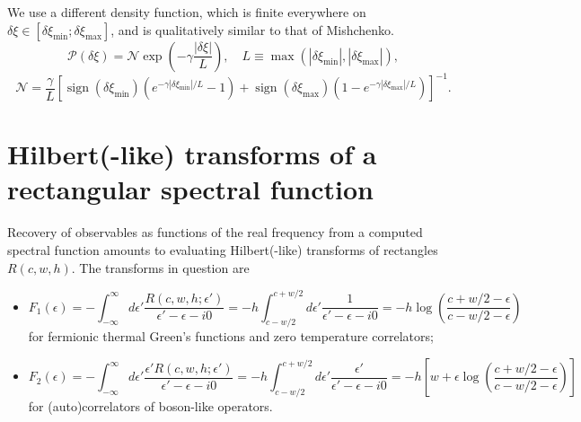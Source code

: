 \documentclass[]{article}
\DeclareMathOperator{\sign}{sign}
\begin{document}
We use a different density function, which is finite everywhere on $\delta\xi\in[\delta\xi_\mathrm{min};\delta\xi_\mathrm{max}]$, and is qualitatively similar to that of Mishchenko.
\begin{equation}
	\mathcal{P}(\delta\xi) = \mathcal{N}
	\exp\left(-\gamma \frac{|\delta\xi|}{L}\right), \quad
	L \equiv \max(|\delta\xi_\mathrm{min}|, |\delta\xi_\mathrm{max}|),
\end{equation}
\begin{equation}
	\mathcal{N} = \frac{\gamma}{L}\left[
		\sign(\delta\xi_\mathrm{min})(e^{-\gamma|\delta\xi_\mathrm{min}|/L} - 1) +
		\sign(\delta\xi_\mathrm{max})(1 - e^{-\gamma|\delta\xi_\mathrm{max}|/L})
	\right]^{-1}.
\end{equation}

\section{Hilbert(-like) transforms of a rectangular spectral function}
\label{hilbert_transform}

Recovery of observables as functions of the real frequency from a computed spectral function amounts to evaluating Hilbert(-like) transforms of rectangles $R(c,w,h)$. The transforms in question are
\begin{itemize}
    \item
    \begin{equation}
        F_1(\epsilon) =
        - \int_{-\infty}^\infty d\epsilon'
            \frac{R(c,w,h;\epsilon')}{\epsilon' - \epsilon - i0} =
        -h \int_{c-w/2}^{c+w/2} d\epsilon' \frac{1}{\epsilon' - \epsilon - i0} =
        -h \log\left(\frac{c + w / 2 - \epsilon}{c - w / 2 - \epsilon}\right)
    \end{equation}
    for fermionic thermal Green's functions and zero temperature correlators;

    \item
    \begin{equation}
        F_2(\epsilon) =
        - \int_{-\infty}^\infty d\epsilon'
        \frac{\epsilon' R(c,w,h;\epsilon')}{\epsilon' - \epsilon - i0} =
        -h \int_{c-w/2}^{c+w/2} d\epsilon'
            \frac{\epsilon'}{\epsilon' - \epsilon - i0} =
        -h \left[ w + \epsilon \log\left(\frac{c + w / 2 - \epsilon}{c - w / 2 - \epsilon}\right)\right]
    \end{equation}
    for (auto)correlators of boson-like operators.
\end{itemize}
\end{document}
